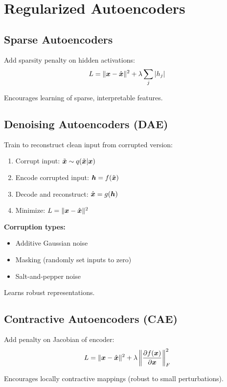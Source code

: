 
\section{Regularized Autoencoders}
\label{sec:regularized-ae}

\subsection{Sparse Autoencoders}

Add sparsity penalty on hidden activations:
\begin{equation}
L = \|\boldsymbol{x} - \hat{\boldsymbol{x}}\|^2 + \lambda \sum_j |h_j|
\end{equation}

Encourages learning of sparse, interpretable features.

\subsection{Denoising Autoencoders (DAE)}

Train to reconstruct clean input from corrupted version:
\begin{enumerate}
    \item Corrupt input: $\tilde{\boldsymbol{x}} \sim q(\tilde{\boldsymbol{x}}|\boldsymbol{x})$
    \item Encode corrupted input: $\boldsymbol{h} = f(\tilde{\boldsymbol{x}})$
    \item Decode and reconstruct: $\hat{\boldsymbol{x}} = g(\boldsymbol{h})$
    \item Minimize: $L = \|\boldsymbol{x} - \hat{\boldsymbol{x}}\|^2$
\end{enumerate}

\textbf{Corruption types:}
\begin{itemize}
    \item Additive Gaussian noise
    \item Masking (randomly set inputs to zero)
    \item Salt-and-pepper noise
\end{itemize}

Learns robust representations.

\subsection{Contractive Autoencoders (CAE)}

Add penalty on Jacobian of encoder:
\begin{equation}
L = \|\boldsymbol{x} - \hat{\boldsymbol{x}}\|^2 + \lambda \left\|\frac{\partial f(\boldsymbol{x})}{\partial \boldsymbol{x}}\right\|_F^2
\end{equation}

Encourages locally contractive mappings (robust to small perturbations).

